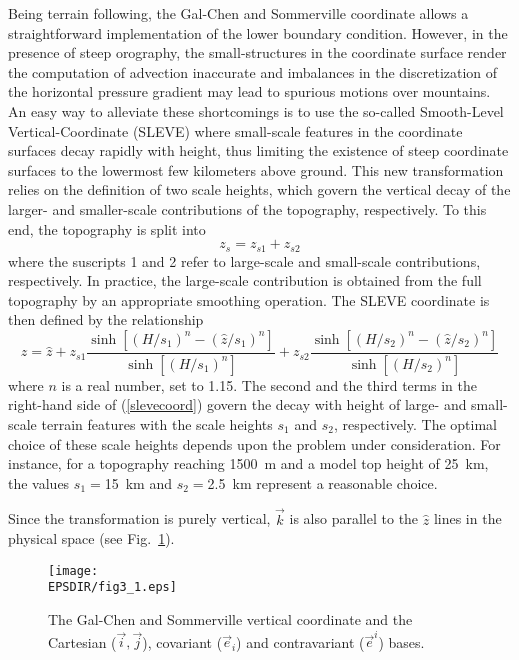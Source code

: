 Being terrain following, the Gal-Chen and Sommerville coordinate allows a
straightforward implementation of the lower boundary condition. However,
in the presence of steep orography, the small-structures in the coordinate 
surface render the computation of advection inaccurate and imbalances in
the discretization of the horizontal pressure gradient may lead to spurious 
motions over mountains. An easy way to alleviate these shortcomings is to 
use the so-called Smooth-Level Vertical-Coordinate (SLEVE) where small-scale
features in the coordinate surfaces decay rapidly with height, thus limiting
the existence of steep coordinate surfaces to the lowermost few kilometers
above ground. This new transformation relies on the definition of two scale 
heights, which govern the vertical decay of the larger- and smaller-scale
contributions of the topography, respectively. To this end, the topography is
split into
\begin{equation}
z_s = z_{s1} +z_{s2}
\end{equation}
where the suscripts 1 and 2 refer to large-scale and small-scale contributions,
respectively. In practice, the large-scale contribution is obtained from the 
full topography by an appropriate smoothing operation. The SLEVE coordinate 
is then defined by the relationship 
\begin{equation}\label{slevecoord}
 z=  \hat z
+ z_{s1} \frac {\sinh [(H/s_1)^n-(\hat z/s_1)^n]} {\sinh [(H/s_1)^n]}
+ z_{s2} \frac {\sinh [(H/s_2)^n-(\hat z/s_2)^n]} {\sinh [(H/s_2)^n]}
\end{equation}
where $n$ is a real number, set to 1.15.
The second and the third terms in the right-hand side of (\ref{slevecoord})
govern the decay with height of large- and small-scale terrain features 
with the scale heights $s_1$ and $s_2$, respectively.
The optimal choice of these scale 
heights depends upon the problem under consideration. For instance, for a 
topography reaching 1500~m and a model top height of 25~km, the values 
$s_1=$15~km and $s_2=$2.5~km represent a reasonable choice.

Since the transformation is purely vertical, $\vec{k}$
is also parallel to the $\widehat{z}$ lines in the physical space
(see Fig.~\ref{galchen}).

\begin{figure}[!ht]
\centerline{\texttt{[image: \\EPSDIR/fig3\_1.eps]}}
\caption{The Gal-Chen and Sommerville vertical coordinate and the Cartesian
($\vec{i},\vec{j}$), covariant ($\vec{e}_i$) and contravariant ($\vec{e}^i$)
bases.}
\label{galchen}
\end{figure}

